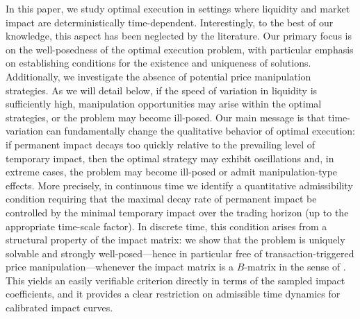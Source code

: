 \documentclass[final,3p,authoryear,12pt]{elsarticle}
\begin{document}
In this paper, we study optimal execution in settings where liquidity and market impact are deterministically time-dependent. Interestingly, to the best of our knowledge, this aspect has been neglected by the literature. Our primary focus is on the well-posedness of the optimal execution problem, with particular emphasis on establishing conditions for the existence and uniqueness of solutions. Additionally, we investigate the absence of potential price manipulation strategies. As we will detail below, if the speed of variation in liquidity is sufficiently high, manipulation opportunities may arise within the optimal strategies, or the problem may become ill-posed. %
Our main message is that time-variation can fundamentally change the qualitative behavior of optimal execution: if permanent impact decays too quickly relative to the prevailing level of temporary impact, then the optimal strategy may exhibit oscillations and, in extreme cases, the problem may become ill-posed or admit manipulation-type effects. More precisely, in continuous time we identify a quantitative admissibility condition requiring that the maximal decay rate of permanent impact be controlled by the minimal temporary impact over the trading horizon (up to the appropriate time-scale factor). In discrete time, this condition arises from a structural property of the impact matrix: we show that the problem is uniquely solvable and strongly well-posed—hence in particular free of transaction-triggered price manipulation—whenever the impact matrix is a $B$-matrix in the sense of \cite{pena2001class}. This yields an easily verifiable criterion directly in terms of the sampled impact coefficients, and it provides a clear restriction on admissible time dynamics for calibrated impact curves.



\end{document}
